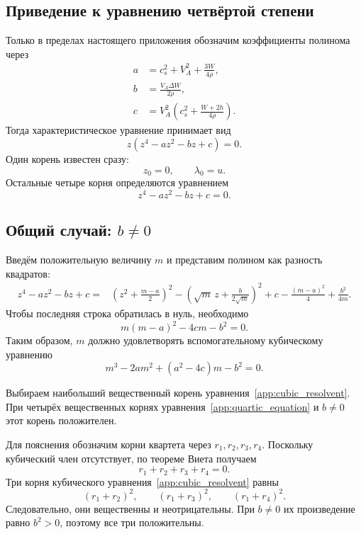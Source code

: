 \documentclass[11pt,a4paper]{article}
\begin{document}
\subsection{Приведение к уравнению четвёртой степени}

Только в пределах настоящего приложения обозначим
коэффициенты полинома через
\[
\begin{aligned}
a&=c_s^2+V_A^2+\frac{3W}{4\rho},\\[3pt]
b&=\frac{V_A\Delta W}{2\rho},\\[3pt]
c&=V_A^2\left(c_s^2+\frac{W+2h}{4\rho}\right).
\end{aligned}
\]
Тогда характеристическое уравнение принимает вид
\[
z\left(z^4-az^2-bz+c\right)=0.
\]
Один корень известен сразу:
\[
z_0=0,\qquad \lambda_0=u.
\]
Остальные четыре корня определяются уравнением
\begin{equation}
z^4-az^2-bz+c=0.
\label{app:quartic_equation}
\end{equation}

\subsection{Общий случай: $b\ne0$}

Введём положительную величину $m$ и представим полином
как разность квадратов:
\[
\begin{aligned}
z^4-az^2-bz+c
={}&
\left(z^2+\frac{m-a}{2}\right)^2
-\left(\sqrt m\,z+\frac{b}{2\sqrt m}\right)^2
+
c-\frac{(m-a)^2}{4}+\frac{b^2}{4m}.
\end{aligned}
\]
Чтобы последняя строка обратилась в нуль, необходимо
\[
m(m-a)^2-4cm-b^2=0.
\]
Таким образом, $m$ должно удовлетворять
вспомогательному кубическому уравнению
\begin{equation}
m^3-2am^2+(a^2-4c)m-b^2=0.
\label{app:cubic_resolvent}
\end{equation}

Выбираем наибольший вещественный корень
уравнения~\eqref{app:cubic_resolvent}.
При четырёх вещественных корнях
уравнения~\eqref{app:quartic_equation} и $b\ne0$
этот корень положителен.

Для пояснения обозначим корни квартета через
$r_1,r_2,r_3,r_4$.
Поскольку кубический член отсутствует, по теореме Виета получаем
\[
r_1+r_2+r_3+r_4=0.
\]
Три корня кубического
уравнения~\eqref{app:cubic_resolvent} равны
\[
(r_1+r_2)^2,\qquad
(r_1+r_3)^2,\qquad
(r_1+r_4)^2.
\]
Следовательно, они вещественны и неотрицательны.
При $b\ne0$ их произведение равно $b^2>0$,
поэтому все три положительны.
\end{document}
